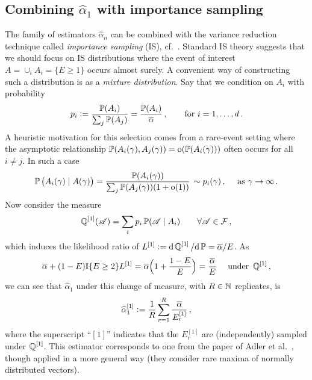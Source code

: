 \subsection{Combining $\hat{\alpha}_1$ with importance sampling} \label{scn:IS}

The family of estimators $\hat{\alpha}_n$ can be combined with the
variance reduction technique called \emph{importance sampling} (IS), cf.\ \cite{asmussen2007stochastic,glasserman2003monte}. Standard IS theory suggests that we should focus on IS distributions where the event of interest $A = \cup_i A_i = \{E \ge 1\}$ occurs almost surely.
A convenient way of constructing such a distribution is as a \emph{mixture distribution}. Say that we condition on $A_i$ with probability
\[ p_i := \frac{\operatorname{{\mathbb P}}(A_i)}{ \sum_j \operatorname{{\mathbb P}}(A_j) } = \frac{\operatorname{{\mathbb P}}(A_i)}{ \overline{\alpha}} \,,\qquad \text{for } i=1,\dots,d\,. \]
A heuristic motivation for this selection comes from a rare-event setting where the asymptotic relationship
$\operatorname{{\mathbb P}}(A_i(\gamma), A_j(\gamma))={\mathrm{o}}(\operatorname{{\mathbb P}}(A_i(\gamma)))$ often occurs for all $i\neq j$. 
In such a case 
\[ 
 \operatorname{{\mathbb P}}\left(A_i(\gamma) \mid A(\gamma) \right) 
   = \dfrac{\operatorname{{\mathbb P}}(A_i(\gamma))}{\sum_j \operatorname{{\mathbb P}}(A_j(\gamma))(1 + {\mathrm{o}}(1))} \,   \sim p_i(\gamma) \,, \quad \text{ as } \gamma \to \infty\,. \]
Now consider the measure
\[ \operatorname{\mathbb Q}^{[1]}( \mathscr{A} ) = \sum_i p_i \operatorname{{\mathbb P}}( \mathscr{A} \mid A_i ) \qquad \forall \mathscr{A} \in \mathcal{F} \,,  \]   
which induces the likelihood ratio of $L^{[1]} := \mathrm{d} \operatorname{\mathbb Q}^{[1]} / \mathrm{d} \operatorname{{\mathbb P}} = \overline{\alpha}/E$. 
As
\[
  \overline{\alpha} + (1-E)\mathbb I\{E \ge 2\} L^{[1]}
  = \overline{\alpha} \Big( 1 + \frac{1-E}{E} \Big) \\
  = \frac{\overline{\alpha}}{E} \quad \text{ under } \operatorname{\mathbb Q}^{[1]}\, ,
\]
we can see that $\hat{\alpha}_1$ under this change of measure, with $R\in {\mathbb N}$ replicates, is
\begin{equation} \label{alpha_1_IS1}
  \hat{\alpha}_{1}^{[1]} := \frac1R \sum_{r=1}^R \frac{\alphaMax}{E_r^{[1]}} \,, %
\end{equation}
where the superscript ``$[1]$'' indicates that the $E_r^{[1]}$ are (independently) sampled under $\operatorname{\mathbb Q}^{[1]}$. This estimator corresponds to one from the paper of Adler et al.\ \cite{adler1990introduction}, though applied in a  more general way (they consider rare maxima of normally distributed vectors). 

